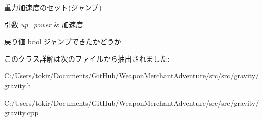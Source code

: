 重力加速度のセット(ジャンプ) 


\begin{DoxyParams}{引数}
{\em up\+\_\+power} & 加速度 \\
\hline
\end{DoxyParams}
\begin{DoxyReturn}{戻り値}
bool ジャンプできたかどうか 
\end{DoxyReturn}


このクラス詳解は次のファイルから抽出されました\+:\begin{DoxyCompactItemize}
\item 
C\+:/\+Users/tokir/\+Documents/\+Git\+Hub/\+Weapon\+Merchant\+Adventure/src/src/gravity/\mbox{\hyperlink{gravity_8h}{gravity.\+h}}\item 
C\+:/\+Users/tokir/\+Documents/\+Git\+Hub/\+Weapon\+Merchant\+Adventure/src/src/gravity/\mbox{\hyperlink{gravity_8cpp}{gravity.\+cpp}}\end{DoxyCompactItemize}
